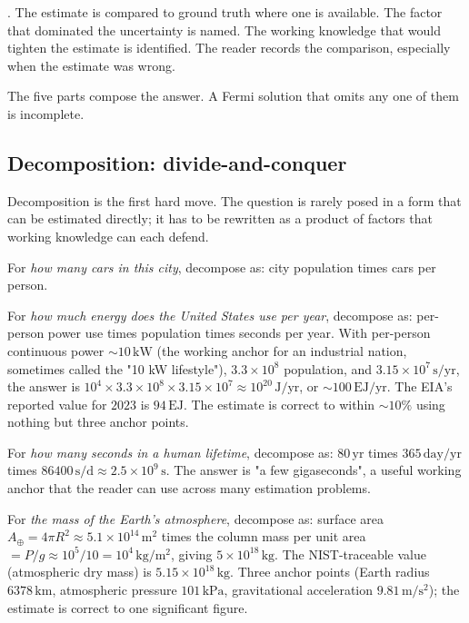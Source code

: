. The estimate is compared to ground truth where
one is available. The factor that dominated the uncertainty is named.
The working knowledge that would tighten the estimate is identified.
The reader records the comparison, especially when the estimate was
wrong.

The five parts compose the answer. A Fermi solution that omits any one
of them is incomplete.

\subsection{Decomposition: divide-and-conquer}

Decomposition is the first hard move. The question is rarely
posed in a form that can be estimated directly; it has to be
rewritten as a product of factors that working knowledge can
each defend.

For \emph{how many cars in this city}, decompose as: city
population times cars per person.

For \emph{how much energy does the United States use per year},
decompose as: per-person power use times population times
seconds per year. With per-person continuous power $\sim
10\,\si{\kilo\watt}$ (the working anchor for an industrial
nation, sometimes called the "10 kW lifestyle"), $3.3 \times
10^{8}$ population, and $3.15 \times 10^{7}\,\si{\second}/
\text{yr}$, the answer is $10^{4} \times 3.3 \times 10^{8} \times
3.15 \times 10^{7} \approx 10^{20}\,\si{\joule}/\text{yr}$, or
$\sim 100\,\text{EJ}/\text{yr}$. The EIA's reported value
for $2023$ is $94\,\text{EJ}$. The estimate is correct to
within $\sim 10\%$ using nothing but three anchor points.

For \emph{how many seconds in a human lifetime}, decompose as:
$80\,\text{yr}$ times $365\,\text{day}/\text{yr}$ times
$86400\,\si{\second\per\day} \approx 2.5 \times 10^{9}\,\si{
\second}$. The answer is "a few gigaseconds", a useful working
anchor that the reader can use across many estimation problems.

For \emph{the mass of the Earth's atmosphere}, decompose as:
surface area $A_{\oplus} = 4\pi R^{2} \approx 5.1 \times 10^{14}
\,\si{\meter\squared}$ times the column mass per unit area
$= P/g \approx 10^{5}/10 = 10^{4}\,\si{\kilo\gram\per\meter
\squared}$, giving $5 \times 10^{18}\,\si{\kilo\gram}$. The
NIST-traceable value (atmospheric dry mass) is $5.15 \times
10^{18}\,\si{\kilo\gram}$. Three anchor points (Earth radius
$6378\,\si{\kilo\meter}$, atmospheric pressure $101\,\si{\kilo
\pascal}$, gravitational acceleration $9.81\,\si{\meter\per
\second\squared}$); the estimate is correct to one significant
figure.


